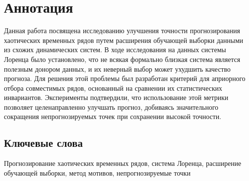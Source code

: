 \section*{Аннотация}
Данная работа посвящена исследованию улучшения точности прогнозирования хаотических временных 
рядов путем расширения обучающей выборки данными из схожих динамических систем. В ходе исследования
 на данных системы Лоренца было установлено, что не всякая формально близкая система является
  полезным донором данных, и их неверный выбор может ухудшить качество прогноза. Для решения 
  этой проблемы был разработан критерий для априорного отбора совместимых
   рядов, основанный на сравнении их статистических инвариантов. Эксперименты подтвердили, что
    использование этой метрики позволяет целенаправленно улучшать прогноз, добиваясь значительного
     сокращения непрогнозируемых точек при сохранении высокой точности.

\subsection*{Ключевые слова}
Прогнозирование хаотических временных рядов, система Лоренца,
расширение обучающей выборки, метод мотивов, непрогнозируемые точки